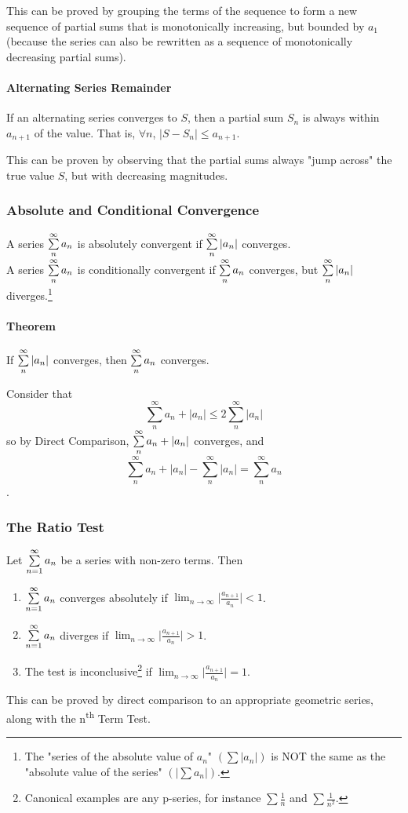 \documentclass{article}
\begin{document}
This can be proved by grouping the terms of the sequence to form a new sequence of partial sums that is monotonically increasing, but bounded by $a_1$ (because the series can also be rewritten as a sequence of monotonically decreasing partial sums).

\paragraph{Alternating Series Remainder} If an alternating series converges to $S$, then a partial sum $S_n$ is always within $a_{n+1}$ of the value. That is, $\forall n$, $|S-S_n| \le a_{n+1}$.

This can be proven by observing that the partial sums always "jump across" the true value $S$, but with decreasing magnitudes.

\subsubsection{Absolute and Conditional Convergence}
A series $\sum_{n}^{\infty}\limits a_n$ is absolutely convergent if $\sum_{n}^{\infty}\limits |a_n|$ converges.\\
A series $\sum_{n}^{\infty}\limits a_n$ is conditionally convergent if $\sum_{n}^{\infty}\limits a_n$ converges, but $\sum_{n}^{\infty}\limits |a_n|$ diverges.\footnote{The "series of the absolute value of $a_n$" $\left(\sum|a_n|\right)$ is NOT the same as the "absolute value of the series" $\left(|\sum a_n|\right)$.}

\paragraph{Theorem} If $\sum_{n}^{\infty}\limits |a_n|$ converges, then $\sum_{n}^{\infty}\limits a_n$ converges.

Consider that $$\sum_{n}^{\infty}a_n + |a_n| \le 2\sum_{n}^{\infty}|a_n|$$
so by Direct Comparison, $\sum_{n}^{\infty}\limits a_n + |a_n|$ converges, and $$\sum_{n}^{\infty} a_n + |a_n| - \sum_{n}^{\infty} |a_n| = \sum_{n}^{\infty} a_n$$.

\subsubsection{The Ratio Test}
Let $\sum_{n=1}^{\infty}\limits a_n$ be a series with non-zero terms. Then
\begin{enumerate}
    \item $\sum_{n=1}^{\infty}\limits a_n$ converges absolutely if $\lim_{n\to\infty}\limits\lvert \frac{a_{n+1}}{a_n} \rvert < 1$.
    \item $\sum_{n=1}^{\infty}\limits a_n$ diverges if $\lim_{n\to\infty}\limits\lvert \frac{a_{n+1}}{a_n} \rvert > 1$.
    \item The test is inconclusive\footnote{Canonical examples are any p-series, for instance $\sum\frac{1}{n}$ and $\sum\frac{1}{n^2}$.} if $\lim_{n\to\infty}\limits\lvert \frac{a_{n+1}}{a_n} \rvert = 1$.
\end{enumerate}
This can be proved by direct comparison to an appropriate geometric series, along with the n\textsuperscript{th} Term Test.
\end{document}
